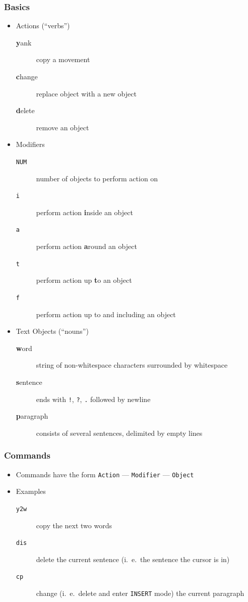 \documentclass{beamer}
\begin{document}
\begin{frame}
    \frametitle{Basics}
    \begin{itemize}
        \item Actions (``verbs'')
            \begin{description}
                \item [\textbf{y}ank]   copy a movement
                \item [\textbf{c}hange] replace object with a new object
                \item [\textbf{d}elete] remove an object
            \end{description}
        \item Modifiers
            \begin{description}
                \item [\texttt{NUM}] number of objects to perform action on
                \item [\texttt{i}]   perform action \textbf{i}nside an object
                \item [\texttt{a}]   perform action \textbf{a}round an object
                \item [\texttt{t}]   perform action up \textbf{t}o an object
                \item [\texttt{f}]   perform action up to and including an object
            \end{description}
        \item Text Objects (``nouns'')
            \begin{description}
                \item [\textbf{w}ord]      string of non-whitespace characters surrounded by whitespace
                \item [\textbf{s}entence]  ends with \texttt{!}, \texttt{?}, \texttt{.} followed by newline
                \item [\textbf{p}aragraph] consists of several sentences, delimited by empty lines
            \end{description}
    \end{itemize}
\end{frame}
\begin{frame}
    \frametitle{Commands}
    \begin{itemize}
        \item Commands have the form \texttt{Action} --- \texttt{Modifier} --- \texttt{Object}
        \item Examples
        \begin{description}
            \item [\texttt{y2w}] copy the next two words
            \item [\texttt{dis}] delete the current sentence (i.\ e.\ the sentence the cursor is in)
            \item [\texttt{cp}]  change (i.\ e.\ delete and enter \texttt{INSERT} mode) the current paragraph
        \end{description}
    \end{itemize}
\end{frame}
\end{document}
